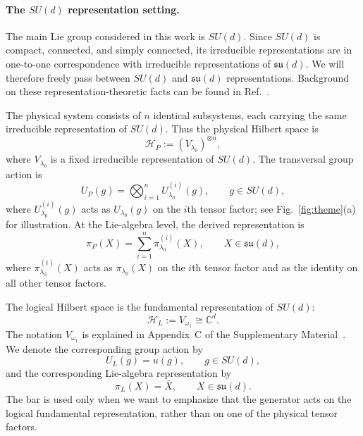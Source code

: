 \documentclass[10pt,twocolumn,superscriptaddress,aps,amsmath,amssymb,citeautoscript,floatfix,prx,longbibliography]{revtex4-2}
\newcounter{alg}
\theoremstyle{plain}
\theoremstyle{plain}
\theoremstyle{plain}
\theoremstyle{plain}
\theoremstyle{plain}
\theoremstyle{plain}
\begin{document}
\paragraph{The $SU(d)$ representation setting.}

The main Lie group considered in this work is $SU(d)$. Since $SU(d)$ is compact, connected, and simply connected, its irreducible representations are in one-to-one correspondence with irreducible representations of $\mathfrak{su}(d)$. We will therefore freely pass between $SU(d)$ and $\mathfrak{su}(d)$ representations. Background on these representation-theoretic facts can be found in Ref.~\cite{Hall2015}.

The physical system consists of $n$ identical subsystems, each carrying the same irreducible representation of $SU(d)$. Thus the physical Hilbert space is
\begin{equation}\label{eq:phys_space_rep}
\mathcal H_P
:=
(V_{\lambda_0})^{\otimes n},
\end{equation}
where $V_{\lambda_0}$ is a fixed irreducible representation of $SU(d)$. The transversal group action is
\begin{equation}\label{eq:group_phys_space_rep}
U_P(g)
=
\bigotimes_{i=1}^n
U_{\lambda_0}^{(i)}(g),
\qquad
g\in SU(d),
\end{equation}
where $U_{\lambda_0}^{(i)}(g)$ acts as $U_{\lambda_0}(g)$ on the $i$th tensor factor; see Fig.~\ref{fig:theme}(a) for illustration. At the Lie-algebra level, the derived representation is
\begin{equation}\label{eq:alg_phys_space_rep}
\pi_P(X)
=
\sum_{i=1}^n
\pi_{\lambda_0}^{(i)}(X),
\qquad
X\in\mathfrak{su}(d),
\end{equation}
where $\pi_{\lambda_0}^{(i)}(X)$ acts as $\pi_{\lambda_0}(X)$ on the $i$th tensor factor and as the identity on all other tensor factors.

The logical Hilbert space is the fundamental representation of $SU(d)$:
\begin{equation}\label{eq:log_space_rep}
\mathcal H_L
:=
V_{\omega_1}
\cong
\mathbb C^d .
\end{equation}
The notation $V_{\omega_1}$ is explained in Appendix~C of the Supplementary Material~\cite{SuppMat}. We denote the corresponding group action by
$$
U_L(g)
=
u(g),
\qquad
g\in SU(d),
$$
and the corresponding Lie-algebra representation by
$$
\pi_L(X)
=
\bar X,
\qquad
X\in\mathfrak{su}(d).
$$
The bar is used only when we want to emphasize that the generator acts on the logical fundamental representation, rather than on one of the physical tensor factors.
\end{document}
